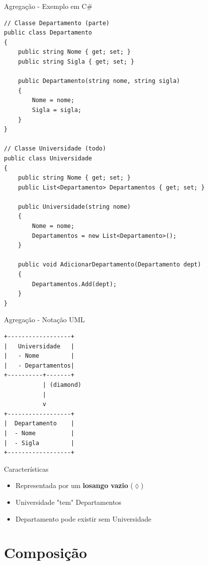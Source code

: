 \documentclass[aspectratio=169]{beamer}
\begin{document}
\begin{frame}{Agregação - Exemplo em C\#}
\begin{lstlisting}
// Classe Departamento (parte)
public class Departamento
{
    public string Nome { get; set; }
    public string Sigla { get; set; }
    
    public Departamento(string nome, string sigla)
    {
        Nome = nome;
        Sigla = sigla;
    }
}

// Classe Universidade (todo)
public class Universidade
{
    public string Nome { get; set; }
    public List<Departamento> Departamentos { get; set; }
    
    public Universidade(string nome)
    {
        Nome = nome;
        Departamentos = new List<Departamento>();
    }
    
    public void AdicionarDepartamento(Departamento dept)
    {
        Departamentos.Add(dept);
    }
}
\end{lstlisting}
\end{frame}

\begin{frame}[fragile]{Agregação - Notação UML}
\begin{center}
\begin{verbatim}
+------------------+
|   Universidade   |
|   - Nome         |
|   - Departamentos|
+----------+-------+
           | (diamond)
           |
           v
+------------------+
|  Departamento    |
|  - Nome          |
|  - Sigla         |
+------------------+
\end{verbatim}
\end{center}

\vspace{0.5cm}
\begin{block}{Características}
\begin{itemize}
\item Representada por um \textbf{losango vazio} ($\lozenge$)
\item Universidade "tem" Departamentos
\item Departamento pode existir sem Universidade
\end{itemize}
\end{block}
\end{frame}

\section{Composição}
\end{document}
